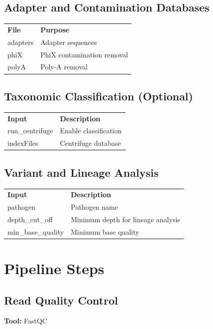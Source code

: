 \documentclass[11pt]{article}
\begin{document}
\subsection{Adapter and Contamination Databases}

\begin{longtable}{p{4cm} p{10cm}}
\textbf{File} & \textbf{Purpose} \\
adapters & Adapter sequences \\
phiX & PhiX contamination removal \\
polyA & Poly-A removal \\
\end{longtable}

\subsection{Taxonomic Classification (Optional)}

\begin{longtable}{p{4cm} p{10cm}}
\textbf{Input} & \textbf{Description} \\
run\_centrifuge & Enable classification \\
indexFiles & Centrifuge database \\
\end{longtable}

\subsection{Variant and Lineage Analysis}

\begin{longtable}{p{4cm} p{10cm}}
\textbf{Input} & \textbf{Description} \\
pathogen & Pathogen name \\
depth\_cut\_off & Minimum depth for lineage analysis \\
min\_base\_quality & Minimum base quality \\
\end{longtable}

\section{Pipeline Steps}

\subsection{Read Quality Control}

\textbf{Tool:} FastQC
\end{document}
